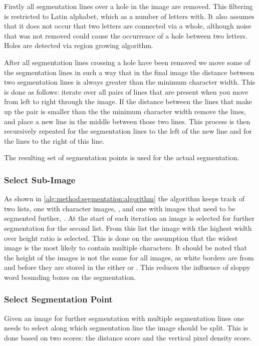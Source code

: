 	Firstly all segmentation lines over a hole in the image are removed. This filtering is restricted to Latin alphabet, which as a number of letters with. It also assumes that it  does not occur that two letters are connected via a whole, although noise that was not removed could cause the occurrence of a hole between two letters. Holes are detected via region growing algorithm. 

	After all segmentation lines crossing a hole have been removed we move some of the segmentation lines in such a way that in the final image the distance between two segmentation lines is always greater than the minimum character width. This is done as follows: iterate over all pairs of lines that are present when you move from left to right through the image. If the distance between the lines that make up the pair is smaller than the the minimum character width remove the lines, and place a new line in the middle between those two lines. This process is then recursively repeated for the segmentation lines to the left of the new line and for the lines to the right of this line. 


	The resulting set of segmentation points is used for the actual segmentation. 

\subsubsection{Select Sub-Image}
\label{sss:method:segmentaton:selectsubimage}
	As shown in \cref{alg:method:segmentation:algorithm} the algorithm keeps track of two lists, one with character images, \characters, and one with images that need to be segmented further, \segmentfurther. At the start of each iteration an image is selected for further segmentation for the second list. From this list the image with the highest width over height ratio is selected. This is done on the assumption that the widest image is the most likely to contain multiple characters. It should be noted that the height of the images is not the same for all images, as white borders are from \leftsubimage and \rightsubimage before they are stored in the either \characters or \segmentfurther. This reduces the influence of sloppy word bounding boxes on the segmentation.

\subsubsection{Select Segmentation Point}
\label{sss:method:segmentaton:selectssp}
	Given an image for further segmentation with multiple segmentation lines one needs to select along which segmentation line the image should be split. This is done based on two scores: the distance score and the vertical pixel density score. 

